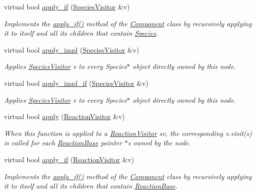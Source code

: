 \begin{DoxyCompactItemize}
virtual bool \hyperlink{classchem_1_1Component_a97dbbb586bb63e5ea296a20778006c5d}{apply\-\_\-if} (\hyperlink{classchem_1_1SpeciesVisitor}{Species\-Visitor} \&v)
\begin{DoxyCompactList}\small\item\em Implements the \hyperlink{classchem_1_1Component_af351fbf0deb48884c27806997f5954fd}{apply\-\_\-if()} method of the \hyperlink{classchem_1_1Component}{Component} class by recursively applying it to itself and all its children that contain \hyperlink{classchem_1_1Species}{Species}. \end{DoxyCompactList}\item 
virtual bool \hyperlink{classchem_1_1Component_a5dcddefb6fd14be8973a35e9787f87ca}{apply\-\_\-impl} (\hyperlink{classchem_1_1SpeciesVisitor}{Species\-Visitor} \&v)
\begin{DoxyCompactList}\small\item\em Applies \hyperlink{classchem_1_1SpeciesVisitor}{Species\-Visitor} v to every Species$\ast$ object directly owned by this node. \end{DoxyCompactList}\item 
virtual bool \hyperlink{classchem_1_1Component_a7e28efdd01ed9613ebb7fad8e3a24b07}{apply\-\_\-impl\-\_\-if} (\hyperlink{classchem_1_1SpeciesVisitor}{Species\-Visitor} \&v)
\begin{DoxyCompactList}\small\item\em Applies \hyperlink{classchem_1_1SpeciesVisitor}{Species\-Visitor} v to every Species$\ast$ object directly owned by this node. \end{DoxyCompactList}\item 
virtual bool \hyperlink{classchem_1_1Component_a04abbd7b2e96d2ea320f88921266f596}{apply} (\hyperlink{classchem_1_1ReactionVisitor}{Reaction\-Visitor} \&v)
\begin{DoxyCompactList}\small\item\em When this function is applied to a \hyperlink{classchem_1_1ReactionVisitor}{Reaction\-Visitor} sv, the corresponding v.\-visit(s) is called for each \hyperlink{classchem_1_1ReactionBase}{Reaction\-Base} pointer $\ast$s owned by the node. \end{DoxyCompactList}\item 
virtual bool \hyperlink{classchem_1_1Component_ac68ab2a8444e5f9ae4f5cc0b5fb9104d}{apply\-\_\-if} (\hyperlink{classchem_1_1ReactionVisitor}{Reaction\-Visitor} \&v)
\begin{DoxyCompactList}\small\item\em Implements the \hyperlink{classchem_1_1Component_af351fbf0deb48884c27806997f5954fd}{apply\-\_\-if()} method of the \hyperlink{classchem_1_1Component}{Component} class by recursively applying it to itself and all its children that contain \hyperlink{classchem_1_1ReactionBase}{Reaction\-Base}. \end{DoxyCompactList}\item 

\end{DoxyCompactItemize}
